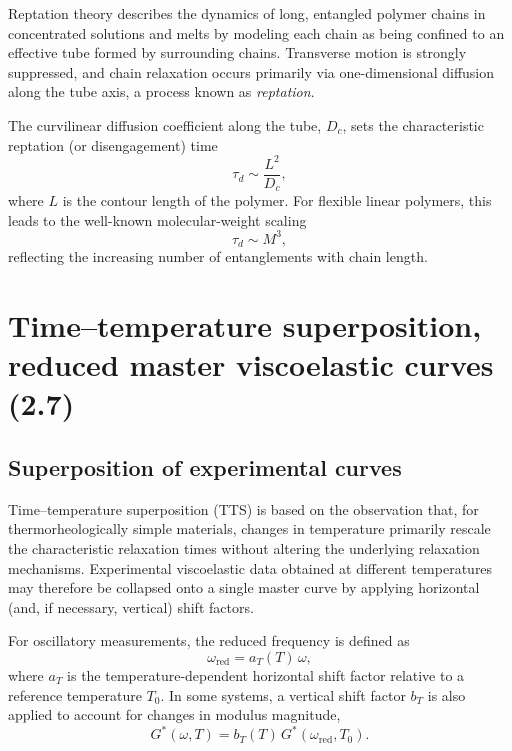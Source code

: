 Reptation theory describes the dynamics of long, entangled polymer chains in concentrated solutions and melts by modeling each chain as being confined to an effective tube formed by surrounding chains. Transverse motion is strongly suppressed, and chain relaxation occurs primarily via one-dimensional diffusion along the tube axis, a process known as \emph{reptation}.

The curvilinear diffusion coefficient along the tube, $D_c$, sets the characteristic reptation (or disengagement) time
\begin{equation}
\tau_d \sim \frac{L^2}{D_c},
\end{equation}
where $L$ is the contour length of the polymer. For flexible linear polymers, this leads to the well-known molecular-weight scaling
\begin{equation}
\tau_d \sim M^3,
\end{equation}
reflecting the increasing number of entanglements with chain length.

\section{Time--temperature superposition, reduced master viscoelastic curves (2.7)}

\subsection{Superposition of experimental curves}

Time--temperature superposition (TTS) is based on the observation that, for thermorheologically simple materials, changes in temperature primarily rescale the characteristic relaxation times without altering the underlying relaxation mechanisms. Experimental viscoelastic data obtained at different temperatures may therefore be collapsed onto a single master curve by applying horizontal (and, if necessary, vertical) shift factors.

For oscillatory measurements, the reduced frequency is defined as
\begin{equation}
\omega_\mathrm{red} = a_T(T)\,\omega,
\end{equation}
where $a_T$ is the temperature-dependent horizontal shift factor relative to a reference temperature $T_0$. In some systems, a vertical shift factor $b_T$ is also applied to account for changes in modulus magnitude,
\begin{equation}
G^*(\omega,T) = b_T(T)\, G^*(\omega_\mathrm{red}, T_0).
\end{equation}


